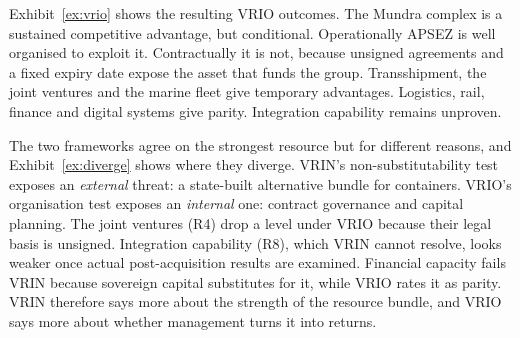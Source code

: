 \documentclass[12pt, a4paper]{article}
\begin{document}
Exhibit~\ref{ex:vrio} shows the resulting VRIO outcomes. The Mundra complex is a
sustained competitive advantage, but conditional. Operationally APSEZ is well
organised to exploit it. Contractually it is not, because unsigned agreements
and a fixed expiry date expose the asset that funds the group. Transshipment,
the joint ventures and the marine fleet give temporary advantages. Logistics,
rail, finance and digital systems give parity. Integration capability remains
unproven.

The two frameworks agree on the strongest resource but for different reasons,
and Exhibit~\ref{ex:diverge} shows where they diverge. VRIN's
non-substitutability test exposes an \emph{external} threat: a state-built
alternative bundle for containers. VRIO's organisation test exposes an
\emph{internal} one: contract governance and capital planning. The joint
ventures (R4) drop a level under VRIO because their legal basis is unsigned.
Integration capability (R8), which VRIN cannot resolve, looks weaker once
actual post-acquisition results are examined. Financial capacity fails VRIN
because sovereign capital substitutes for it, while VRIO rates it as parity.
VRIN therefore says more about the strength of the resource bundle, and VRIO
says more about whether management turns it into returns.
\end{document}
